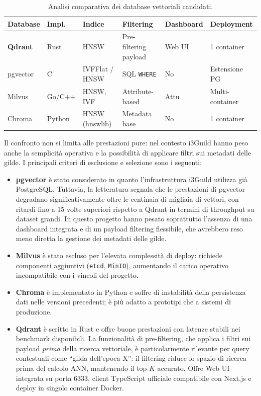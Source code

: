 \begin{table}[ht]
  \centering
  \caption{Analisi comparativa dei database vettoriali candidati.}
  \label{tab:vectordb_comparison}
  \small
  \begin{tabularx}{\textwidth}{L{1.5cm}L{1.5cm}L{1.4cm}YYY}
    \toprule
    \textbf{Database} & \textbf{Impl.} & \textbf{Indice} &
      \textbf{Filtering} & \textbf{Dashboard} & \textbf{Deployment} \\
    \midrule
    \textbf{Qdrant} & Rust & HNSW & Pre-filtering payload & Web UI &
      1 container \\
    pgvector & C & IVFFlat / HNSW & SQL \texttt{WHERE} & No &
      Estensione PG \\
    Milvus & Go/C++ & HNSW, IVF & Attribute-based & Attu &
      Multi-container \\
    Chroma & Python & HNSW (hnswlib) & Metadata base & No & 1 container \\
    \bottomrule
  \end{tabularx}
\end{table}

Il confronto non si limita alle prestazioni pure: nel contesto i3Guild hanno
peso anche la semplicità operativa e la possibilità di applicare filtri sui
metadati delle gilde. I principali criteri di esclusione e selezione sono i
seguenti:

\begin{itemize}
  \item \textbf{pgvector} è stato considerato in quanto l'infrastruttura
    i3Guild utilizza già PostgreSQL. Tuttavia, la letteratura segnala che le
    prestazioni di pgvector degradano significativamente oltre le centinaia di
    migliaia di vettori, con ritardi fino a 15 volte superiori rispetto a
    Qdrant in termini di throughput su dataset grandi. In questo progetto hanno
    pesato soprattutto l'assenza di una dashboard integrata e di un payload
    filtering flessibile, che avrebbero reso meno diretta la gestione dei
    metadati delle gilde.
  \item \textbf{Milvus} è stato escluso per l'elevata complessità di deploy:
    richiede componenti aggiuntivi (\texttt{etcd}, \texttt{MinIO}), aumentando
    il carico operativo incompatibile con i vincoli del progetto.
  \item \textbf{Chroma} è implementato in Python e soffre di instabilità della
    persistenza dati nelle versioni precedenti; è più adatto a prototipi
    che a sistemi di produzione.
  \item \textbf{Qdrant} è scritto in Rust e offre buone prestazioni con latenze
    stabili nei benchmark disponibili. La funzionalità di pre-filtering, che
    applica i filtri sui payload \emph{prima} della ricerca vettoriale, è
    particolarmente rilevante per query
    contestuali come ``gilda dell'epoca X'': il filtering riduce lo spazio di
    ricerca prima del calcolo ANN, mantenendo il top-$K$ accurato. Offre Web
    UI integrata su porta 6333, client TypeScript ufficiale compatibile con
    Next.js e deploy in singolo container Docker.
\end{itemize}

